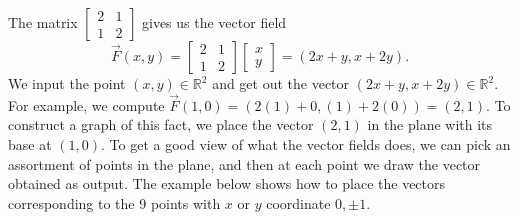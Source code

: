 \begin{example}
The matrix $\begin{bmatrix}2&1\\1&2\end{bmatrix}$ gives us the vector field $$\vec F(x,y)=\begin{bmatrix}2&1\\1&2\end{bmatrix}\begin{bmatrix}x\\y\end{bmatrix}=(2x+y,x+2y).$$ We input the point $(x,y)\in {\mathbb{R}}^2$ and get out the vector $(2x+y,x+2y)\in {\mathbb{R}}^2$.  For example, we compute $\vec F(1,0) = (2(1)+0,(1)+2(0)) = (2,1)$. To construct a graph of this fact, we place the vector $(2,1)$ in the plane with its base at $(1,0)$. To get a good view of what the vector fields does, we can pick an assortment of points in the plane, and then at each point we draw the vector obtained as output. The example below shows how to place the vectors corresponding to the 9 points with $x$ or $y$ coordinate $0, \pm 1$.  

\begin{center}
\end{center}



\end{example}
